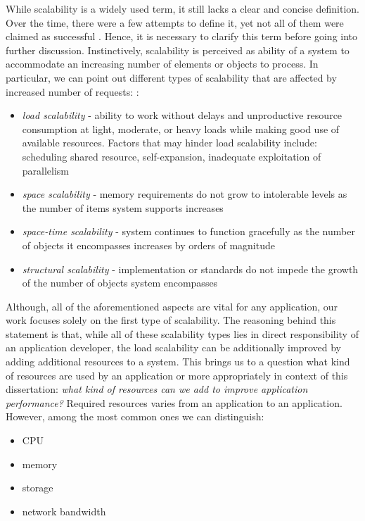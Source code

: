 While scalability is a widely used term, it still lacks a clear and concise definition. Over the time, there were a few attempts to define it, yet not all of them were claimed as successful \cite{Hi90} \cite{DuRoWi06}. Hence, it is necessary to clarify this term before going into further discussion. Instinctively, scalability is perceived as ability of a system to accommodate an increasing number of elements or objects to process. In particular, we can point out different types of scalability that are affected by increased number of requests: \cite{Bo00}:
\begin{itemize}
	\item \textit{load scalability} - ability to work without delays and unproductive resource consumption at light, moderate, or heavy loads while making good use of available resources. Factors that may hinder load scalability include: scheduling shared resource, self-expansion, inadequate exploitation of parallelism
	\item \textit{space scalability} - memory requirements do not grow to intolerable levels as the number of items system supports increases
	\item \textit{space-time scalability} - system continues to function gracefully as the number of objects it encompasses increases by orders of magnitude
	\item \textit{structural scalability} - implementation or standards do not impede the growth of the number of objects system encompasses
\end{itemize}
Although, all of the aforementioned aspects are vital for any application, our work focuses solely on the first type of scalability. The reasoning behind this statement is that, while all of these scalability types lies in direct responsibility of an application developer, the load scalability can be additionally improved by adding additional resources to a system. This brings us to a question what kind of resources are used by an application or more appropriately in context of this dissertation: \textit{what kind of resources can we add to improve application performance?} Required resources varies from an application to an application. However, among the most common ones we can distinguish:
\begin{itemize}
	\item CPU
	\item memory
	\item storage
	\item network bandwidth
\end{itemize}

